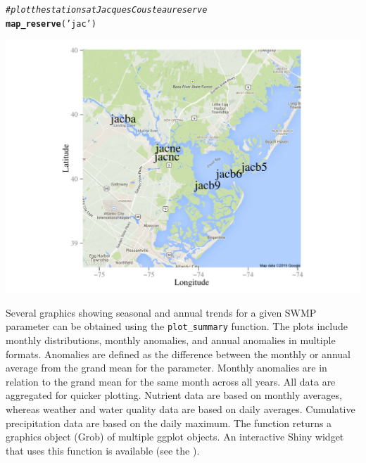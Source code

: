 \documentclass[10pt,letterpaper]{article}\usepackage[]{graphicx}\usepackage[]{color}
\makeatletter
\def\maxwidth{ %
  \ifdim\Gin@nat@width>\linewidth
    \linewidth
  \else
    \Gin@nat@width
  \fi
}
\newcommand{\hlstr}[1]{\textcolor[rgb]{0.192,0.494,0.8}{#1}}%
\newcommand{\hlcom}[1]{\textcolor[rgb]{0.678,0.584,0.686}{\textit{#1}}}%
\newcommand{\hlstd}[1]{\textcolor[rgb]{0.345,0.345,0.345}{#1}}%
\newcommand{\hlkwd}[1]{\textcolor[rgb]{0.737,0.353,0.396}{\textbf{#1}}}%
\newenvironment{kframe}{%
 \def\at@end@of@kframe{}%
 \ifinner\ifhmode%
  \def\at@end@of@kframe{\end{minipage}}%
  \begin{minipage}{\columnwidth}%
 \fi\fi%
 \def\FrameCommand##1{\hskip\@totalleftmargin \hskip-\fboxsep
 \colorbox{shadecolor}{##1}\hskip-\fboxsep
     \hskip-\linewidth \hskip-\@totalleftmargin \hskip\columnwidth}%
 \MakeFramed {\advance\hsize-\width
   \@totalleftmargin\z@ \linewidth\hsize
   \@setminipage}}%
 {\par\unskip\endMakeFramed%
 \at@end@of@kframe}
\newenvironment{knitrout}{}{} %
\makeatother
\begin{document}
\begin{knitrout}
\color{fgcolor}\begin{kframe}
\begin{alltt}
\hlcom{# plot the stations at Jacques Cousteau reserve}
\hlkwd{map_reserve}\hlstd{(}\hlstr{'jac'}\hlstd{)}
\end{alltt}
\end{kframe}

{\centering \includegraphics[width=\maxwidth]{figure/unnamed-chunk-19} 

}



\end{knitrout}

Several graphics showing seasonal and annual trends for a given SWMP parameter can be obtained using the \texttt{plot\_summary} function.  The plots include monthly distributions, monthly anomalies, and annual anomalies in multiple formats.  Anomalies are defined as the difference between the monthly or annual average from the grand mean for the parameter.  Monthly anomalies are in relation to the grand mean for the same month across all years.  All data are aggregated for quicker plotting.  Nutrient data are based on monthly averages, whereas weather and water quality data are based on daily averages.  Cumulative precipitation data are based on the daily maximum. The function returns a graphics object (Grob) of multiple ggplot objects.  An interactive Shiny widget that uses this function is available (see the ).
\end{document}
